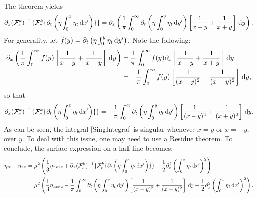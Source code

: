 \documentclass[10pt,reqno,oneside,a4paper]{article}
\begin{document}
The theorem yields 
\[ \partial_x(\mathcal{F}^k_s)^{-1} \{ \mathcal{F}^k_c \{ \partial_t \left( \eta \int^{x}_0\eta_{t} \,\mathrm{d} x' \right)\} \}
= \partial_x \left( \frac{1}{\pi} \int_0^\infty \partial_t \left( \eta \int^{y}_0\eta_{t} \,\mathrm{d} y' \right)  \left[ \frac{1}{x-y} + \frac{1}{x+y} \right] \,\mathrm{d} y \right). \]
For generality, let $f(y) = \partial_t \left( \eta \int^{y}_0\eta_{t} \,\mathrm{d} y' \right).$ Note the following:
\begin{align*} 
\partial_x \left( \frac{1}{\pi} \int_0^\infty f(y) \left[ \frac{1}{x-y} + \frac{1}{x+y} \right] \,\mathrm{d} y \right) &= \frac{1}{\pi} \int_0^\infty f(y) \partial_x \left[ \frac{1}{x-y} + \frac{1}{x+y} \right] \,\mathrm{d} y \\
&= - \frac{1}{\pi} \int_0^\infty f(y)  \left[ \frac{1}{(x-y)^2} + \frac{1}{(x+y)^2} \right] \,\mathrm{d} y,
\end{align*}
so that
\begin{equation}\label{SingIntegral}
\partial_x(\mathcal{F}^k_s)^{-1} \{ \mathcal{F}^k_c \{ \partial_t \left( \eta \int^{x}_0\eta_{t} \,\mathrm{d} x' \right)\} \} = - \frac{1}{\pi} \int_0^\infty \partial_t \left( \eta \int^{y}_0\eta_{t} \,\mathrm{d} y' \right) \left[ \frac{1}{(x-y)^2} + \frac{1}{(x+y)^2} \right] \,\mathrm{d} y.
\end{equation}
As can be seen, the integral \eqref{SingIntegral} is singular whenever $x = y$ or $x = -y,$ over $y.$ To deal with this issue, one may need to use a Residue theorem. To conclude, the surface expression on a half-line becomes:
\begin{align*}
 \eta_{tt} - \eta_{xx} &= \mu^2 \left( \frac{1}{3} \eta_{xxxx}  + \partial_x(\mathcal{F}^k_s)^{-1} \{ \mathcal{F}^k_c \{ \partial_t \left( \eta \int^{x}_0\eta_{t} \,\mathrm{d} x' \right)\} \} + \frac{1}{2} \partial^2_x\left(\int^{x}_0\eta_{t} \,\mathrm{d} x' \right)^2\right) \\
 &= \mu^2 \left( \frac{1}{3} \eta_{xxxx}  - \frac{1}{\pi} \int_0^\infty \partial_t \left( \eta \int^{y}_0\eta_{t} \,\mathrm{d} y' \right) \left[ \frac{1}{(x-y)^2} + \frac{1}{(x+y)^2} \right] \,\mathrm{d} y + \frac{1}{2} \partial^2_x\left(\int^{x}_0\eta_{t} \,\mathrm{d} x' \right)^2\right) . 
\end{align*}


{\small}
\end{document}
